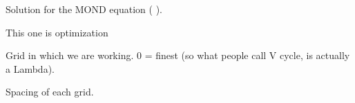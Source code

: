 \documentclass[letterpaper,10pt,english]{sphinxmanual}
\begin{document}
\begin{fulllineitems}

\begin{fulllineitems}
\label{\detokenize{data_structure:c.grids_gravity_mm.chi}}%
\pysigstartmultiline
{}%
\pysigstopmultiline
Solution for the MOND equation (
).

\end{fulllineitems}


\begin{fulllineitems}
\label{\detokenize{data_structure:c.grids_gravity_mm.cte_poisson_over_a}}%
\pysigstartmultiline
{}%
\pysigstopmultiline
\end{fulllineitems}


\begin{fulllineitems}
\label{\detokenize{data_structure:c.grids_gravity_mm.fourh}}%
\pysigstartmultiline
{}%
\pysigstopmultiline
This one is optimization

\end{fulllineitems}


\begin{fulllineitems}
\label{\detokenize{data_structure:c.grids_gravity_mm.g}}%
\pysigstartmultiline
{}%
\pysigstopmultiline
Grid in which we are working.  0 = finest (so what people call V cycle, is actually a Lambda).

\end{fulllineitems}


\begin{fulllineitems}
\label{\detokenize{data_structure:c.grids_gravity_mm.h}}%
\pysigstartmultiline
{}%
\pysigstopmultiline
Spacing of each grid.


\end{fulllineitems}
\end{fulllineitems}
\end{document}
